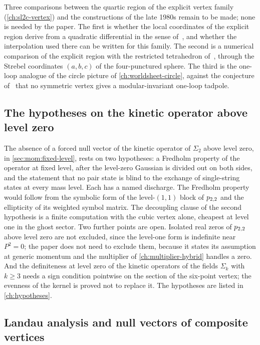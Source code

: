 Three comparisons between the quartic region of the explicit vertex family (\cref{ch:sl2c-vertex}) and the constructions of the late 1980s remain to be made; none is needed by the paper.
The first is whether the local coordinates of the explicit region derive from a quadratic differential in the sense of~\cite{Sonoda:1990:ClosedStringField}, and whether the interpolation used there can be written for this family.
The second is a numerical comparison of the explicit region with the restricted tetrahedron of~\cite{Saadi:1989:ClosedStringField}, through the Strebel coordinates $(a, b, c)$ of the four-punctured sphere.
The third is the one-loop analogue of the circle picture of \cref{ch:worldsheet-circle}, against the conjecture of~\cite{Sonoda:1990:CovariantClosedString} that no symmetric vertex gives a modular-invariant one-loop tadpole.

\subsection{The hypotheses on the kinetic operator above level zero}
\label{sec:open:above-level-zero}

The absence of a forced null vector of the kinetic operator of $\Sigma_2$ above level zero, in \cref{sec:mom:fixed-level}, rests on two hypotheses: a Fredholm property of the operator at fixed level, after the level-zero Gaussian is divided out on both sides, and the statement that no pair state is blind to the exchange of single-string states at every mass level.
Each has a named discharge.
The Fredholm property would follow from the symbolic form of the level-$(1, 1)$ block of $p_{2,2}$ and the ellipticity of its weighted symbol matrix.
The decoupling clause of the second hypothesis is a finite computation with the cubic vertex alone, cheapest at level one in the ghost sector.
Two further points are open.
Isolated real zeros of $p_{2,2}$ above level zero are not excluded, since the level-one form is indefinite near $P^2 = 0$; the paper does not need to exclude them, because it states its assumption at generic momentum and the multiplier of \cref{ch:multiplier-hybrid} handles a zero.
And the definiteness at level zero of the kinetic operators of the fields $\Sigma_k$ with $k \ge 3$ needs a sign condition pointwise on the section of the six-point vertex; the evenness of the kernel is proved not to replace it.
The hypotheses are listed in \cref{ch:hypotheses}.

\subsection{Landau analysis and null vectors of composite vertices}
\label{sec:open:landau}

